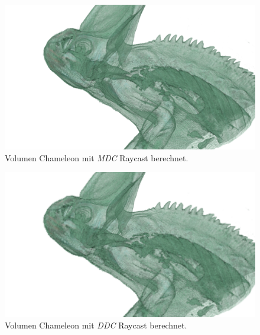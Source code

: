 \begin{landscape}
	\begin{figure}
		\centering
		\includegraphics[width=1\textheight]{../../Grafiken/results/picture_quality/chameleon/MDC_img-0-96_ray-1-5.png}
		\caption{Volumen Chameleon mit \emph{MDC} Raycast berechnet.}
		\label{fig::res::cam_mdc}
	\end{figure}
\end{landscape}

\begin{landscape}
	\begin{figure}
		\centering
		\includegraphics[width=1\textheight]{../../Grafiken/results/picture_quality/chameleon/DDC_img-1_ray-1-5.png}
		\caption{Volumen Chameleon mit \emph{DDC} Raycast berechnet.}
		\label{fig::res::cam_ddc}
	\end{figure}
\end{landscape}


